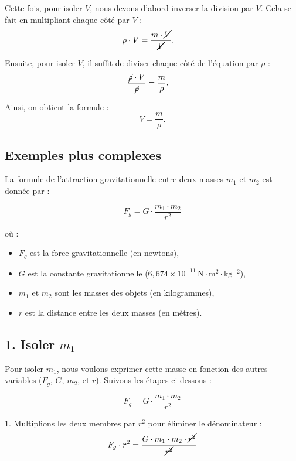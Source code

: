 \documentclass[a4paper,12pt]{article}
\begin{document}
Cette fois, pour isoler $V$, nous devons d'abord inverser la division par $V$. Cela se fait en multipliant chaque côté par $V$ :
\begin{align}
 \rho \cdot V &= \frac{m \cdot \cancel{V}}{\cancel{V}}.
\end{align}

Ensuite, pour isoler $V$, il suffit de diviser chaque côté de l'équation par $\rho$ :
\begin{align}
\frac{\cancel{\rho} \cdot V}{\cancel{\rho}} &= \frac{m}{\rho}.
\end{align}

Ainsi, on obtient la formule :
\begin{equation}
V = \frac{m}{\rho}.
\end{equation}

\subsection*{Exemples plus complexes}

La formule de l'attraction gravitationnelle entre deux masses $ m_1 $ et $ m_2 $ est donnée par :

\[
F_g = G \cdot \frac{m_1 \cdot m_2}{r^2}
\]

où :

\begin{itemize}
    \item $ F_g $ est la force gravitationnelle (en newtons),
    \item $ G $ est la constante gravitationnelle ($ 6,674 \times 10^{-11} \, \mathrm{N \cdot m^2 \cdot kg^{-2}} $),
    \item $ m_1 $ et $ m_2 $ sont les masses des objets (en kilogrammes),
    \item $ r $ est la distance entre les deux masses (en mètres).
\end{itemize}

\subsection*{1. Isoler $ m_1 $}

Pour isoler $ m_1 $, nous voulons exprimer cette masse en fonction des autres variables ($ F_g $, $ G $, $ m_2 $, et $ r $). Suivons les étapes ci-dessous :

\[
F_g = G \cdot \frac{m_1 \cdot m_2}{r^2}
\]

1. Multiplions les deux membres par $ r^2 $ pour éliminer le dénominateur :
\[
F_g \cdot r^2 = \frac{G \cdot m_1 \cdot m_2 \cdot \cancel{r^2}}{\cancel{r^2}}
\]
\end{document}
